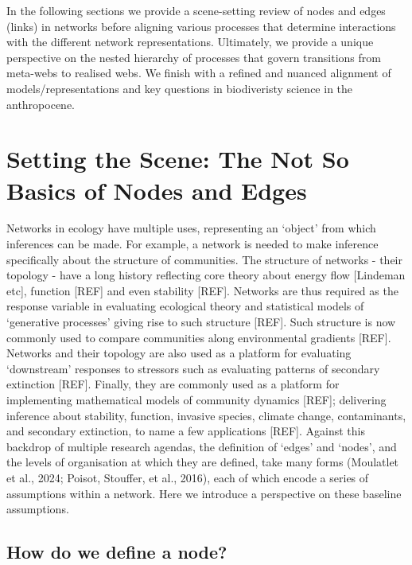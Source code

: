 \documentclass[
]{article}
\begin{document}
In the following sections we provide a scene-setting review of nodes and
edges (links) in networks before aligning various processes that
determine interactions with the different network representations.
Ultimately, we provide a unique perspective on the nested hierarchy of
processes that govern transitions from meta-webs to realised webs. We
finish with a refined and nuanced alignment of models/representations
and key questions in biodiveristy science in the anthropocene.

\section{Setting the Scene: The Not So Basics of Nodes and
Edges}\label{sec-anatomy}

Networks in ecology have multiple uses, representing an `object' from
which inferences can be made. For example, a network is needed to make
inference specifically about the structure of communities. The structure
of networks - their topology - have a long history reflecting core
theory about energy flow {[}Lindeman etc{]}, function {[}REF{]} and even
stability {[}REF{]}. Networks are thus required as the response variable
in evaluating ecological theory and statistical models of `generative
processes' giving rise to such structure {[}REF{]}. Such structure is
now commonly used to compare communities along environmental gradients
{[}REF{]}. Networks and their topology are also used as a platform for
evaluating `downstream' responses to stressors such as evaluating
patterns of secondary extinction {[}REF{]}. Finally, they are commonly
used as a platform for implementing mathematical models of community
dynamics {[}REF{]}; delivering inference about stability, function,
invasive species, climate change, contaminants, and secondary
extinction, to name a few applications {[}REF{]}. Against this backdrop
of multiple research agendas, the definition of `edges' and `nodes', and
the levels of organisation at which they are defined, take many forms
(Moulatlet et al., 2024; Poisot, Stouffer, et al., 2016), each of which
encode a series of assumptions within a network. Here we introduce a
perspective on these baseline assumptions.

\subsection{How do we define a node?}\label{how-do-we-define-a-node}
\end{document}
